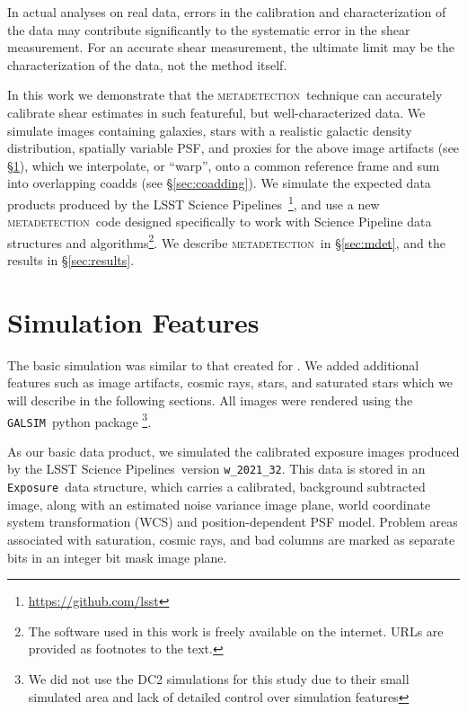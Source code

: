 \documentclass[twocolumn,twocolappendix,astrosym]{openjournal}
\newcommand{\galsim}{\texttt{GALSIM}}
\newcommand{\calexp}{\texttt{Exposure}}
\newcommand{\dm}{LSST Science Pipelines}
\newcommand{\mdet}{\textsc{metadetection}}
\begin{document}
In actual analyses on real data, errors in the calibration and characterization
of the data may contribute significantly to the systematic error in the shear
measurement.  For an accurate shear measurement, the ultimate limit may be the
characterization of the data, not the method itself.

In this work we demonstrate that the \mdet\ technique can accurately calibrate
shear estimates in such featureful, but well-characterized data.  We simulate
images containing galaxies, stars with a realistic galactic density
distribution, spatially variable PSF, and proxies for the above image artifacts
(see \S \ref{sec:sim}), which we interpolate, or ``warp'', onto a common
reference frame and sum into overlapping coadds (see \S \ref{sec:coadding}).
We simulate the expected data products produced by the \dm\
\citep{BoschLSST2019,BoschHSC2017}\footnote{\url{https://github.com/lsst}}, and
use a new \mdet\ code designed specifically to work with Science Pipeline data
structures and algorithms\footnote{The software used in this work is freely
available on the internet.  URLs are provided as footnotes to the text.}.  We
describe \mdet\ in \S \ref{sec:mdet}, and the results in \S \ref{sec:results}.

\section{Simulation Features} \label{sec:sim}

The basic simulation was similar to that created for \citep{mdet20}.  We added
additional features such as image artifacts, cosmic rays, stars, and saturated
stars which we will describe in the following sections.  All images were
rendered using the \galsim\ python package \citep{galsim2015}\footnote{We did
not use the DC2 simulations \citep{DC2Abolfathi2021} for this study due to their
small simulated area and lack of detailed control over simulation features}.

As our basic data product, we simulated the calibrated exposure images produced
by the \dm\ version \texttt{w\_2021\_32}.  This data is stored in an \calexp\
data structure, which carries a calibrated, background subtracted image, along
with an estimated noise variance image plane, world coordinate system
transformation (WCS) and position-dependent PSF model.  Problem areas
associated with saturation, cosmic rays, and bad columns are marked as separate
bits in an integer bit mask image plane.

\end{document}
